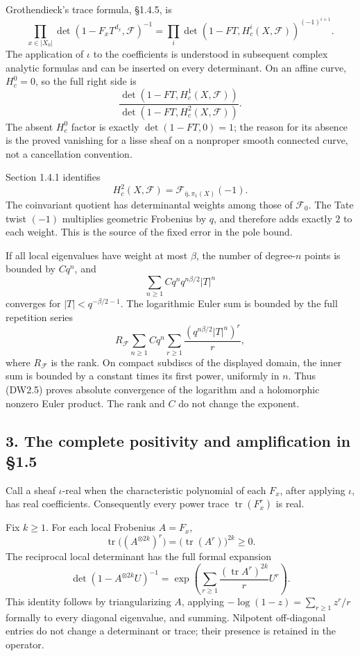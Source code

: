 Grothendieck's trace formula, §1.4.5, is \[
\prod_{x\in|X_0|}
 \det(1-F_xT^{d_x},\mathcal F)^{-1}
=
\prod_i\det(1-FT,H_c^i(X,\mathcal F))^{(-1)^{i+1}}.
\tag{DW2.2}
\] The application of \(\iota\) to the coefficients is understood in
subsequent complex analytic formulas and can be inserted on every
determinant. On an affine curve, \(H_c^0=0\), so the full right side is
\[
\frac{\det(1-FT,H_c^1(X,\mathcal F))}
     {\det(1-FT,H_c^2(X,\mathcal F))}.
\tag{DW2.3}
\] The absent \(H_c^0\) factor is exactly \(\det(1-FT,0)=1\); the reason
for its absence is the proved vanishing for a lisse sheaf on a nonproper
smooth connected curve, not a cancellation convention.

Section 1.4.1 identifies \[
H_c^2(X,\mathcal F)
=\mathcal F_{\bar\eta,\pi_1(X)}(-1).
\tag{DW2.4}
\] The coinvariant quotient has determinantal weights among those of
\(\mathcal F_0\). The Tate twist \((-1)\) multiplies geometric Frobenius
by \(q\), and therefore adds exactly \(2\) to each weight. This is the
source of the fixed error in the pole bound.

If all local eigenvalues have weight at most \(\beta\), the number of
degree-\(n\) points is bounded by \(Cq^n\), and \[
\sum_{n\ge1}Cq^n q^{n\beta/2}|T|^n
\tag{DW2.5}
\] converges for \(|T|<q^{-\beta/2-1}\). The logarithmic Euler sum is
bounded by the full repetition series \[
R_{\mathcal F}\sum_{n\ge1}Cq^n
\sum_{r\ge1}\frac{(q^{n\beta/2}|T|^n)^r}{r},
\tag{DW2.6}
\] where \(R_{\mathcal F}\) is the rank. On compact subdiscs of the
displayed domain, the inner sum is bounded by a constant times its first
power, uniformly in \(n\). Thus (DW2.5) proves absolute convergence of
the logarithm and a holomorphic nonzero Euler product. The rank and
\(C\) do not change the exponent.

\subsection{3. The complete positivity and amplification in
§1.5}\label{the-complete-positivity-and-amplification-in-1.5}

Call a sheaf \(\iota\)-real when the characteristic polynomial of each
\(F_x\), after applying \(\iota\), has real coefficients. Consequently
every power trace \(\operatorname{tr}(F_x^r)\) is real.

Fix \(k\ge1\). For each local Frobenius \(A=F_x\), \[
\operatorname{tr}\bigl((A^{\otimes2k})^r\bigr)
=\bigl(\operatorname{tr}(A^r)\bigr)^{2k}\ge0.
\tag{DW3.1}
\] The reciprocal local determinant has the full formal expansion \[
\det(1-A^{\otimes2k}U)^{-1}
=\exp\left(\sum_{r\ge1}
\frac{(\operatorname{tr}A^r)^{2k}}rU^r\right).
\tag{DW3.2}
\] This identity follows by triangularizing \(A\), applying
\(-\log(1-z)=\sum_{r\ge1}z^r/r\) formally to every diagonal eigenvalue,
and summing. Nilpotent off-diagonal entries do not change a determinant
or trace; their presence is retained in the operator.

